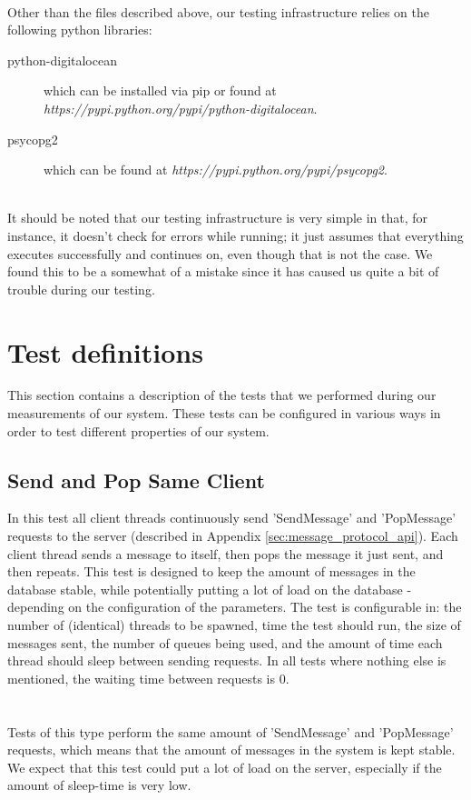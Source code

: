 \documentclass{article}
\begin{document}
        \\
        Other than the files described above, our testing infrastructure relies on the following python libraries: 
        \begin{description}
            \item[python-digitalocean] which can be installed via pip or found at \textit{https://pypi.python.org/pypi/python-digitalocean}.
            \item[psycopg2] which can be found at \textit{https://pypi.python.org/pypi/psycopg2}.
        \end{description}
        ~\\
        It should be noted that our testing infrastructure is very simple in that, for instance, it doesn't check for errors while running; it just assumes that everything executes successfully and continues on, even though that is not the case. We found this to be a somewhat of a mistake since it has caused us quite a bit of trouble during our testing.

    \section{Test definitions}
        \label{sec:test_definitions}
        This section contains a description of the tests that we performed during our measurements of our system. These tests can be configured in various ways in order to test different properties of our system.

        \subsection{Send and Pop Same Client}
            In this test all client threads continuously send 'SendMessage' and 'PopMessage' requests to the server (described in Appendix \ref{sec:message_protocol_api}). Each client thread sends a message to itself, then pops the message it just sent, and then repeats. This test is designed to keep the amount of messages in the database stable, while potentially putting a lot of load on the database - depending on the configuration of the parameters. The test is configurable in: the number of (identical) threads to be spawned, time the test should run, the size of messages sent, the number of queues being used, and the amount of time each thread should sleep between sending requests. In all tests where nothing else is mentioned, the waiting time between requests is 0.\\
            \\
            \\
            Tests of this type perform the same amount of 'SendMessage' and 'PopMessage' requests, which means that the amount of messages in the system is kept stable. We expect that this test could put a lot of load on the server, especially if the amount of sleep-time is very low.
\end{document}
